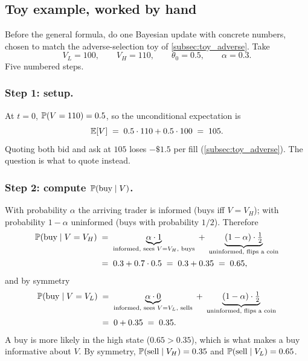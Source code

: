 \subsection{Toy example, worked by hand}
\label{subsec:gm_toy}

Before the general formula, do one Bayesian update with concrete
numbers, chosen to match the adverse-selection toy of
\cref{subsec:toy_adverse}. Take
\[
  V_L = 100, \qquad V_H = 110, \qquad \theta_0 = 0.5,
  \qquad \alpha = 0.3.
\]
Five numbered steps.

\subsubsection{Step 1: setup.}
At $t = 0$, $\mathbb{P}(V = 110) = 0.5$, so the unconditional expectation is
\[
  \mathbb{E}[V] \;=\; 0.5 \cdot 110 + 0.5 \cdot 100 \;=\; 105.
\]
Quoting both bid and ask at $105$ loses $-\$1.5$ per fill
(\cref{subsec:toy_adverse}). The question is what to quote instead.

\subsubsection{Step 2: compute $\mathbb{P}(\text{buy} \mid V)$.}
With probability $\alpha$ the arriving trader is informed (buys iff
$V = V_H$); with probability $1 - \alpha$ uninformed (buys with
probability $1/2$). Therefore
\begin{align*}
  \mathbb{P}(\text{buy} \mid V = V_H)
  \;&=\; \underbrace{\alpha \cdot 1}_{\text{informed, sees }V=V_H\text{, buys}}
       \;+\; \underbrace{(1 - \alpha) \cdot \tfrac{1}{2}}_{\text{uninformed, flips a coin}} \\
  \;&=\; 0.3 + 0.7 \cdot 0.5
  \;=\; 0.3 + 0.35
  \;=\; 0.65,
\end{align*}
and by symmetry
\begin{align*}
  \mathbb{P}(\text{buy} \mid V = V_L)
  \;&=\; \underbrace{\alpha \cdot 0}_{\text{informed, sees }V=V_L\text{, sells}}
       \;+\; \underbrace{(1 - \alpha) \cdot \tfrac{1}{2}}_{\text{uninformed, flips a coin}} \\
  \;&=\; 0 + 0.35
  \;=\; 0.35.
\end{align*}
A buy is more likely in the high state ($0.65 > 0.35$), which is
what makes a buy informative about $V$. By symmetry,
$\mathbb{P}(\text{sell} \mid V_H) = 0.35$ and $\mathbb{P}(\text{sell} \mid
V_L) = 0.65$.

